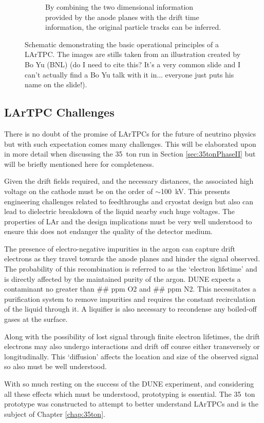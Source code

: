 \begin{figure}[p]
\begin{subfigure}[t]{0.48\linewidth}
    \caption{By combining the two dimensional information provided by the anode planes with the drift time information, the original particle tracks can be inferred.}
    \label{fig:LArTPCOperation4}
  \end{subfigure}
  \caption[Schematic demonstrating the basic operational principles of a LArTPC.]{Schematic demonstrating the basic operational principles of a LArTPC.  The images are stills taken from an illustration created by Bo Yu (BNL) (do I need to cite this?  It's a very common slide and I can't actually find a Bo Yu talk with it in... everyone just puts his name on the slide!).}
  \label{fig:LArTPCOperation}
\end{figure}

\subsection{LArTPC Challenges}\label{sec:LArTPCChallenges}

There is no doubt of the promise of LArTPCs for the future of neutrino physics but with such expectation comes many challenges.  This will be elaborated upon in more detail when discussing the 35~ton run in Section \ref{sec:35tonPhaseII} but will be briefly mentioned here for completeness.

Given the drift fields required, and the necessary distances, the associated high voltage on the cathode must be on the order of $\sim$100~kV.  This presents engineering challenges related to feedthroughs and cryostat design but also can lead to dielectric breakdown of the liquid nearby such huge voltages.  The properties of LAr and the design implications must be very well understood to ensure this does not endanger the quality of the detector medium.

The presence of electro-negative impurities in the argon can capture drift electrons as they travel towards the anode planes and hinder the signal observed.  The probability of this recombination is referred to as the `electron lifetime' and is directly affected by the maintained purity of the argon.  DUNE expects a contaminant no greater than \#\# ppm O2 and \#\# ppm N2.  This necessitates a purification system to remove impurities and requires the constant recirculation of the liquid through it.  A liquifier is also necessary to recondense any boiled-off gases at the surface.

Along with the possibility of lost signal through finite electron lifetimes, the drift electrons may also undergo interactions and drift off course either transversely or longitudinally.  This `diffusion' affects the location and size of the observed signal so also must be well understood.

With so much resting on the success of the DUNE experiment, and considering all these effects which must be understood, prototyping is essential.  The 35~ton prototype was constructed to attempt to better understand LArTPCs and is the subject of Chapter \ref{chap:35ton}.
